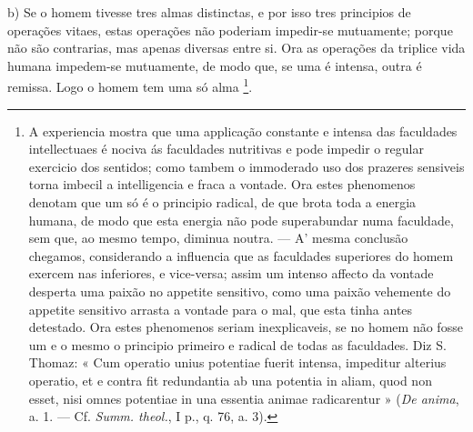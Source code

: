 b) Se o homem tivesse tres almas distinctas, e por isso tres principios de operações vitaes, estas operações não poderiam impedir-se mutuamente; porque não são contrarias, mas apenas diversas entre si. Ora as operações da triplice vida humana impedem-se mutuamente, de modo que, se uma é intensa, outra é remissa. Logo o homem tem uma só alma \footnote{A experiencia mostra que uma applicação constante e intensa das faculdades intellectuaes é nociva ás faculdades nutritivas e pode impedir o regular exercicio dos sentidos; como tambem o immoderado uso dos prazeres sensiveis torna imbecil a intelligencia e fraca a vontade. Ora estes phenomenos denotam que um só é o principio radical, de que brota toda a energia humana, de modo que esta energia não pode superabundar numa faculdade, sem que, ao mesmo tempo, diminua noutra. --- A' mesma conclusão chegamos, considerando a influencia que as faculdades superiores do homem exercem nas inferiores, e vice-versa; assim um intenso affecto da vontade desperta uma paixão no appetite sensitivo, como uma paixão vehemente do appetite sensitivo arrasta a vontade para o mal, que esta tinha antes detestado. Ora estes phenomenos seriam inexplicaveis, se no homem não fosse um e o mesmo o principio primeiro e radical de todas as faculdades. Diz S. Thomaz: « Cum operatio unius potentiae fuerit intensa, impeditur alterius operatio, et e contra fit redundantia ab una potentia in aliam, quod non esset, nisi omnes potentiae in una essentia animae radicarentur » (\emph{De anima}, a. 1. --- Cf. \emph{Summ. theol.}, I p., q. 76, a. 3).}.

